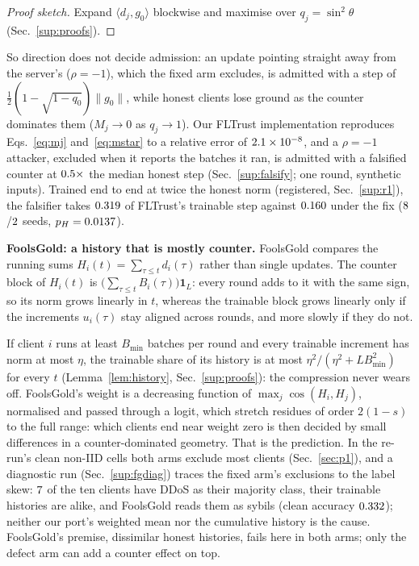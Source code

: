 \documentclass[journal]{IEEEtran}
\begin{document}
\begin{proof}[Proof sketch]
Expand $\langle d_j,g_0\rangle$ blockwise and maximise over $q_j=\sin^2\theta$
(Sec.~\ref{sup:proofs}).
\end{proof}

So direction does not decide admission: an update pointing straight away from
the server's ($\rho=-1$), which the fixed arm excludes, is admitted with a step
of $\tfrac12(1-\sqrt{1-q_0})\|g_0\|$, while honest clients lose ground as the
counter dominates them ($M_j\to0$ as $q_j\to1$). Our FLTrust implementation
reproduces Eqs.~\eqref{eq:mj} and~\eqref{eq:mstar} to a relative error of
$2.1\times10^{-8}$, and a $\rho=-1$ attacker, excluded when it reports the batches it
ran, is admitted with a falsified counter at $0.5\times$ the median honest
step (Sec.~\ref{sup:falsify}; one round, synthetic inputs). Trained end to end at
twice the honest norm (registered, Sec.~\ref{sup:r1}), the falsifier takes
$0.319$ of FLTrust's trainable step against $0.160$ under the fix
($8$/$2$ seeds, $p_H=0.0137$).

\textbf{FoolsGold: a history that is mostly counter.} FoolsGold compares the
running sums $H_i(t)=\sum_{\tau\le t}d_i(\tau)$ rather than single updates. The
counter block of $H_i(t)$ is $\big(\sum_{\tau\le t}B_i(\tau)\big)\mathbf{1}_L$:
every round adds to it with the same sign, so its norm grows linearly in $t$,
whereas the trainable block grows linearly only if the increments $u_i(\tau)$ stay
aligned across rounds, and more slowly if they do not.

If client $i$ runs at least $B_{\min}$ batches per round and every trainable
increment has norm at most $\eta$, the trainable share of its history is at most
$\eta^2/(\eta^2+LB_{\min}^2)$ for every $t$ (Lemma~\ref{lem:history}, Sec.~\ref{sup:proofs}):
the compression never wears off.
FoolsGold's weight is a decreasing function of $\max_j\cos(H_i,H_j)$, normalised
and passed through a logit, which stretch residues of order $2(1-s)$ to the full
range: which clients end near weight zero is then decided by small differences in
a counter-dominated geometry. That is the prediction. In the re-run's clean non-IID cells both
arms exclude most clients (Sec.~\ref{sec:p1}), and a diagnostic run
(Sec.~\ref{sup:fgdiag}) traces the fixed arm's exclusions to the label skew:
$7$ of the ten clients have DDoS as their majority class, their
trainable histories are alike, and FoolsGold reads them as sybils (clean accuracy
$0.332$); neither our port's weighted mean nor the cumulative history is the
cause. FoolsGold's premise, dissimilar honest histories, fails here in both arms;
only the defect arm can add a counter effect on top.
\end{document}
